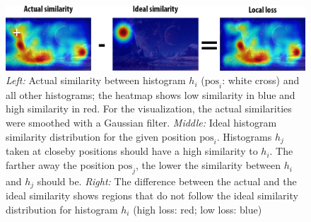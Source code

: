\documentclass[11pt]{report}
\begin{document}
\begin{figure}[h!]
\begin{center}
\includegraphics[width=1\columnwidth]{local_loss}
\caption{{\label{fig:local_loss}\emph{Left:} Actual similarity between
    histogram $h_i$ ($\text{pos}_i$: white cross) and all other
    histograms; the heatmap shows low similarity in blue and high
    similarity in red.  For the visualization, the actual similarities
    were smoothed with a Gaussian filter. \emph{Middle:} Ideal
    histogram similarity distribution for the given position
    $\text{pos}_i$. Histograms $h_j$ taken at closeby positions should
    have a high similarity to $h_i$. The farther away the position
    $\text{pos}_j$, the lower the similarity between $h_i$ and $h_j$
    should be. \emph{Right:} The difference between the actual and the
    ideal similarity shows regions that do not follow the ideal
    similarity distribution for histogram $h_i$ (high loss: red; low
    loss: blue)}}
\end{center}
\end{figure}
\end{document}
